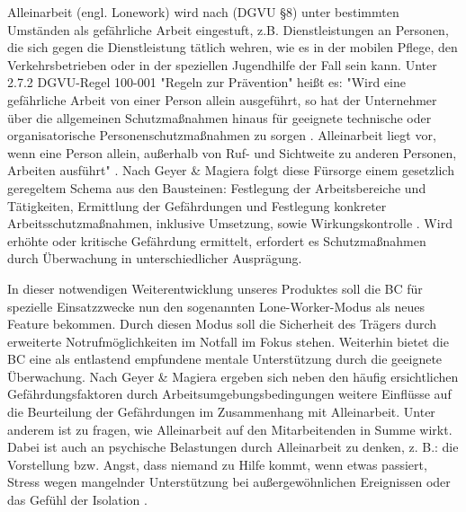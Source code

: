 \documentclass[thesis.tex]{subfiles}
\begin{document}
Alleinarbeit (engl. Lonework) wird nach (DGVU §8) \cite[§8]{Vorschrift1_DGUV} unter bestimmten Umständen als gefährliche Arbeit eingestuft, z.B. Dienstleistungen an Personen, die sich gegen die Dienstleistung tätlich wehren, wie es in der mobilen Pflege, den Verkehrsbetrieben oder in der speziellen Jugendhilfe der Fall sein kann.
Unter 2.7.2 DGVU-Regel 100-001 "Regeln zur Prävention" heißt es: "Wird eine gefährliche Arbeit von einer Person allein ausgeführt, so hat der Unternehmer über die allgemeinen Schutzmaßnahmen hinaus für geeignete technische oder organisatorische Personenschutzmaßnahmen zu sorgen \cite[§8(2)]{Vorschrift1_DGUV}.
Alleinarbeit liegt vor, wenn eine Person allein, außerhalb von Ruf- und Sichtweite zu anderen Personen, Arbeiten ausführt" \cite[S.42]{Regel_100-001}.
Nach Geyer \& Magiera folgt diese Fürsorge einem gesetzlich geregeltem Schema aus den Bausteinen: Festlegung der Arbeitsbereiche und Tätigkeiten, Ermittlung der Gefährdungen und Festlegung konkreter Arbeitsschutzmaßnahmen, inklusive Umsetzung, sowie Wirkungskontrolle \cite[vgl. S.42 ff.]{GeyerMagiera2022}.
Wird erhöhte oder kritische Gefährdung ermittelt, erfordert es Schutzmaßnahmen durch Überwachung in unterschiedlicher Ausprägung.

In dieser notwendigen Weiterentwicklung unseres Produktes soll die BC für spezielle Einsatzzwecke nun den sogenannten Lone-Worker-Modus als neues Feature bekommen.
Durch diesen Modus soll die Sicherheit des Trägers durch erweiterte Notrufmöglichkeiten im Notfall im Fokus stehen.
Weiterhin bietet die BC eine als entlastend empfundene mentale Unterstützung durch die geeignete Überwachung.
Nach Geyer \& Magiera ergeben sich neben den häufig ersichtlichen Gefährdungsfaktoren durch Arbeitsumgebungsbedingungen weitere Einflüsse auf die Beurteilung der Gefährdungen im Zusammenhang mit Alleinarbeit.
Unter anderem ist zu fragen, wie Alleinarbeit auf den Mitarbeitenden in Summe wirkt.
Dabei ist auch an psychische Belastungen durch Alleinarbeit zu denken, z. B.: die Vorstellung bzw. Angst, dass niemand zu Hilfe kommt, wenn etwas passiert, Stress wegen mangelnder Unterstützung bei außergewöhnlichen Ereignissen oder das Gefühl der Isolation \cite[vgl. S.45]{GeyerMagiera2022}.
\end{document}
